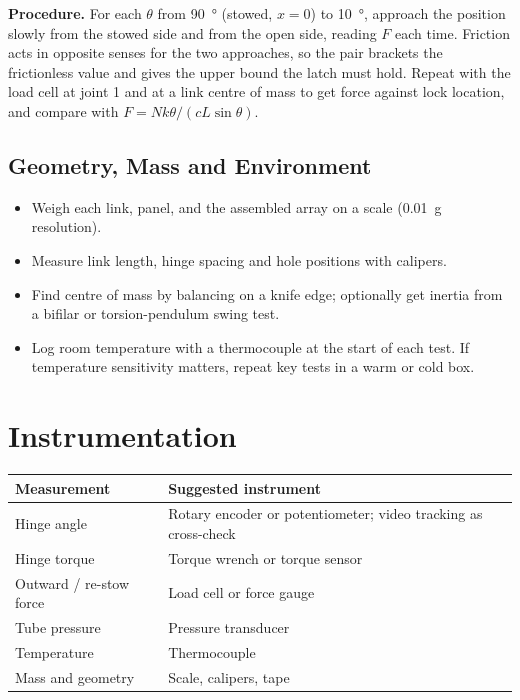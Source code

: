 \documentclass[11pt]{article}
\begin{document}
\textbf{Procedure.} For each $\theta$ from \SI{90}{\degree} (stowed, $x=0$) to \SI{10}{\degree}, approach
the position slowly from the stowed side and from the open side, reading $F$ each time. Friction acts
in opposite senses for the two approaches, so the pair brackets the frictionless value and gives the
upper bound the latch must hold. Repeat with the load cell at joint 1 and at a link centre of mass to
get force against lock location, and compare with $F=N k\theta/(c L\sin\theta)$.

\subsection{Geometry, Mass and Environment}

\begin{itemize}[noitemsep]
    \item Weigh each link, panel, and the assembled array on a scale (\SI{0.01}{g} resolution).
    \item Measure link length, hinge spacing and hole positions with calipers.
    \item Find centre of mass by balancing on a knife edge; optionally get inertia from a bifilar or
          torsion-pendulum swing test.
    \item Log room temperature with a thermocouple at the start of each test. If temperature
          sensitivity matters, repeat key tests in a warm or cold box.
\end{itemize}

\section{Instrumentation}

\begin{center}
\begin{tabular}{ll}
\toprule
Measurement & Suggested instrument \\
\midrule
Hinge angle & Rotary encoder or potentiometer; video tracking as cross-check \\
Hinge torque & Torque wrench or torque sensor \\
Outward / re-stow force & Load cell or force gauge \\
Tube pressure & Pressure transducer \\
Temperature & Thermocouple \\
Mass and geometry & Scale, calipers, tape \\
\bottomrule
\end{tabular}
\end{center}
\end{document}

